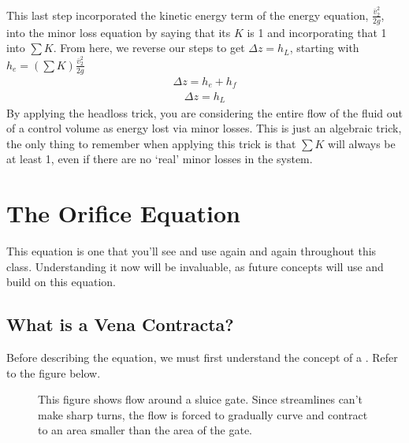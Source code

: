 \documentclass[letterpaper,10pt,english]{sphinxmanual}
\let\sphinxpxdimen\pdfpxdimen\else\newdimen\sphinxpxdimen
\begin{document}
This last step incorporated the kinetic energy term of the energy equation, \(\frac{\bar v_2^2}{2g}\), into the minor loss equation by saying that its \(K\) is 1 and incorporating that 1 into \(\sum K\). From here, we reverse our steps to get \(\Delta z = h_L\), starting with \(h_e = \left( \sum K \right) \frac{\bar v_2^2}{2g}\)
\begin{equation}\label{equation:Fluids_Review/Fluids_Review_Design:Fluids_Review/Fluids_Review_Design:28}
\begin{split}\Delta z = h_e + h_f\end{split}
\end{equation}\begin{equation}\label{equation:Fluids_Review/Fluids_Review_Design:Fluids_Review/Fluids_Review_Design:29}
\begin{split}\Delta z = h_L\end{split}
\end{equation}
By applying the headloss trick, you are considering the entire flow of the fluid out of a control volume as energy lost via minor losses. This is just an algebraic trick, the only thing to remember when applying this trick is that \(\sum K\) will always be at least 1, even if there are no ‘real’ minor losses in the system.


\section{The Orifice Equation}
\label{\detokenize{Fluids_Review/Fluids_Review_Design:the-orifice-equation}}\label{\detokenize{Fluids_Review/Fluids_Review_Design:id10}}
This equation is one that you’ll see and use again and again throughout this class. Understanding it now will be invaluable, as future concepts will use and build on this equation.


\subsection{What is a Vena Contracta?}
\label{\detokenize{Fluids_Review/Fluids_Review_Design:what-is-a-vena-contracta}}
Before describing the equation, we must first understand the concept of a . Refer to the figure below.

\begin{figure}[htbp]
\centering
\capstart

\noindent\sphinxincludegraphics[width=650\sphinxpxdimen]{{sluice_gate_vena_contracta}.png}
\caption{This figure shows flow around a sluice gate. Since streamlines can’t make sharp turns, the flow is forced to gradually curve and contract to an area smaller than the area of the gate.}\label{\detokenize{Fluids_Review/Fluids_Review_Design:id20}}\label{\detokenize{Fluids_Review/Fluids_Review_Design:sluice-gate-vena-contracta}}\end{figure}
\end{document}
